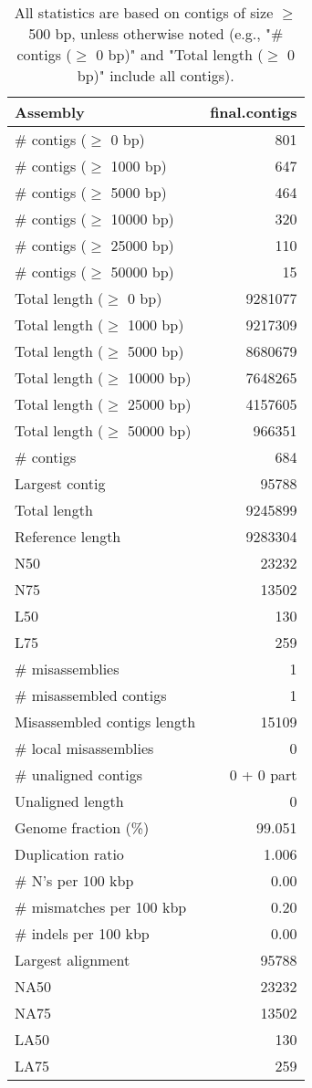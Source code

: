 \documentclass[12pt,a4paper]{article}
\begin{document}
\begin{table}[ht]
\begin{center}
\caption{All statistics are based on contigs of size $\geq$ 500 bp, unless otherwise noted (e.g., "\# contigs ($\geq$ 0 bp)" and "Total length ($\geq$ 0 bp)" include all contigs).}
\begin{tabular}{|l*{1}{|r}|}
\hline
Assembly & final.contigs \\ \hline
\# contigs ($\geq$ 0 bp) & 801 \\ \hline
\# contigs ($\geq$ 1000 bp) & 647 \\ \hline
\# contigs ($\geq$ 5000 bp) & 464 \\ \hline
\# contigs ($\geq$ 10000 bp) & 320 \\ \hline
\# contigs ($\geq$ 25000 bp) & 110 \\ \hline
\# contigs ($\geq$ 50000 bp) & 15 \\ \hline
Total length ($\geq$ 0 bp) & 9281077 \\ \hline
Total length ($\geq$ 1000 bp) & 9217309 \\ \hline
Total length ($\geq$ 5000 bp) & 8680679 \\ \hline
Total length ($\geq$ 10000 bp) & 7648265 \\ \hline
Total length ($\geq$ 25000 bp) & 4157605 \\ \hline
Total length ($\geq$ 50000 bp) & 966351 \\ \hline
\# contigs & 684 \\ \hline
Largest contig & 95788 \\ \hline
Total length & 9245899 \\ \hline
Reference length & 9283304 \\ \hline
N50 & 23232 \\ \hline
N75 & 13502 \\ \hline
L50 & 130 \\ \hline
L75 & 259 \\ \hline
\# misassemblies & 1 \\ \hline
\# misassembled contigs & 1 \\ \hline
Misassembled contigs length & 15109 \\ \hline
\# local misassemblies & 0 \\ \hline
\# unaligned contigs & 0 + 0 part \\ \hline
Unaligned length & 0 \\ \hline
Genome fraction (\%) & 99.051 \\ \hline
Duplication ratio & 1.006 \\ \hline
\# N's per 100 kbp & 0.00 \\ \hline
\# mismatches per 100 kbp & 0.20 \\ \hline
\# indels per 100 kbp & 0.00 \\ \hline
Largest alignment & 95788 \\ \hline
NA50 & 23232 \\ \hline
NA75 & 13502 \\ \hline
LA50 & 130 \\ \hline
LA75 & 259 \\ \hline
\end{tabular}
\end{center}
\end{table}
\end{document}
